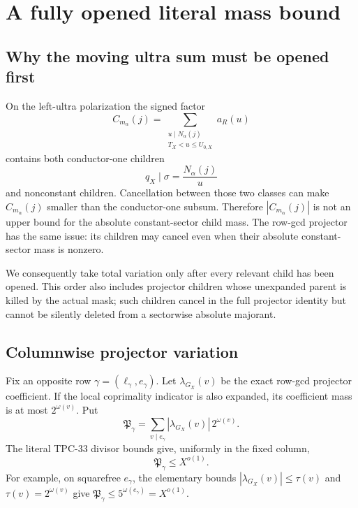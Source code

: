 \section{A fully opened literal mass bound}
\label{sec:mass-bound}

\subsection{Why the moving ultra sum must be opened first}

On the left-ultra polarization the signed factor
\[
 C_{m_\alpha}(j)
 =
 \sum_{\substack{u\mid N_\alpha(j)\\T_X<u\le U_{0,X}}}
 a_R(u)
\]
contains both conductor-one children
\[
 q_X\mid\sigma=\frac{N_\alpha(j)}u
\]
and nonconstant children.  Cancellation between those two classes
can make \(C_{m_\alpha}(j)\) smaller than the conductor-one
subsum.  Therefore \(|C_{m_\alpha}(j)|\) is not an upper bound for
the absolute constant-sector child mass.  The row-gcd projector has
the same issue: its children may cancel even when their absolute
constant-sector mass is nonzero.

We consequently take total variation only after every relevant child
has been opened.  This order also includes projector children whose
unexpanded parent is killed by the actual mask; such children cancel
in the full projector identity but cannot be silently deleted from a
sectorwise absolute majorant.

\subsection{Columnwise projector variation}

Fix an opposite row
\(\gamma=(\ell_\gamma,e_\gamma)\).  Let
\(\lambda_{G_X}(v)\) be the exact row-gcd projector coefficient.
If the local coprimality indicator is also expanded, its coefficient
mass is at most \(2^{\omega(v)}\).  Put
\begin{equation}
 \mathfrak P_\gamma
 =
 \sum_{v\mid e_\gamma}
 |\lambda_{G_X}(v)|\,2^{\omega(v)}.
\label{eq:column-projector-variation}
\end{equation}
The literal TPC-33 divisor bounds give, uniformly in the fixed
column,
\begin{equation}
 \mathfrak P_\gamma\le X^{o(1)}.
\label{eq:column-projector-soft}
\end{equation}
For example, on squarefree \(e_\gamma\), the elementary bounds
\(|\lambda_{G_X}(v)|\le\tau(v)\) and
\(\tau(v)=2^{\omega(v)}\) give
\(\mathfrak P_\gamma\le5^{\omega(e_\gamma)}=X^{o(1)}\).

